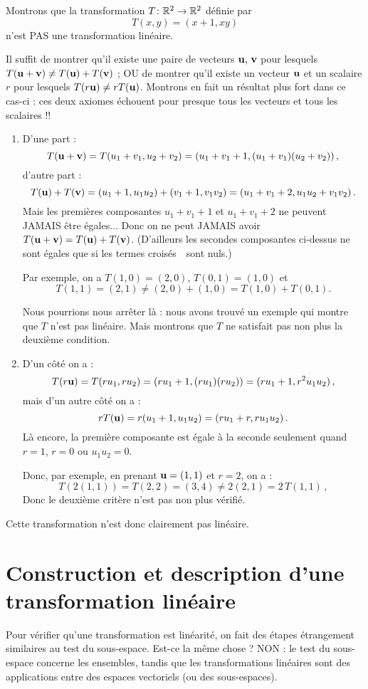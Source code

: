 \begin{myexample} Montrons que la transformation $T \colon \mathbb{R}^2 \to \mathbb{R}^2$ d\'efinie par
$$T(x,y) = (x+1, xy)$$ n'est PAS une transformation linéaire.

Il suffit de montrer qu'il existe une paire de vecteurs $\mathbf{u},\, \mathbf{v}$ 
pour lesquels $T(\mathbf{u}+\mathbf{v}) \neq T(\mathbf{u})+T(\mathbf{v})$ ; OU de montrer qu'il existe
un vecteur $\mathbf{u}$ et un scalaire $r$ pour lesquels $T(r\mathbf{u}) \neq rT(\mathbf{u})$.
Montrons en fait un résultat plus fort dans ce cas-ci : ces deux axiomes échouent pour presque tous les vecteurs
et tous les scalaires !\!!

\begin{enumerate}
\item D'une part : $$T(\mathbf{u} + \mathbf{v}) = T(u_1+v_1,u_2+v_2) = (u_1+v_1+1, (u_1+v_1)(u_2+v_2))\,,$$
d'autre part :
$$
T(\mathbf{u}) + T(\mathbf{v}) = (u_1+1,u_1u_2) + (v_1+1, v_1v_2) = (u_1+v_1+2, u_1u_2+v_1v_2)\,.
$$
Mais les premières composantes $u_1+v_1+1$ et $u_1+v_1+2$ ne peuvent JAMAIS être égales... Donc on ne peut JAMAIS avoir $T(\mathbf{u}+\mathbf{v}) = T(\mathbf{u})+T(\mathbf{v})$. (D'ailleurs les secondes composantes ci-dessus ne sont égales que si les \og termes croisés\ \fg\ sont nuls.)

Par exemple, on a $T(1,0)=(2,0)$, $T(0,1)=(1,0)$ et $$T(1,1)=(2,1) \not=(2,0)+(1,0)=T(1,0) +T(0,1).$$

Nous pourrions nous arrêter là : nous avons trouvé un exemple qui montre que $T$ n'est pas linéaire. Mais montrons que $T$ ne satisfait pas non plus la deuxième condition.
\item D'un côté on a :
$$
T(r\mathbf{u}) = T(ru_1,ru_2) = (ru_1+1, (ru_1)(ru_2)) = (ru_1+1, r^2u_1u_2)\,,
$$
mais d'un autre côté on a :
$$
rT(\mathbf{u}) = r(u_1+1,u_1u_2) = (ru_1+r, ru_1u_2)\,.
$$
L\`a encore, la première composante est égale \`a la seconde seulement quand $r=1$, $r=0$ ou $u_1u_2=0$. 

Donc, par exemple, en prenant $\mathbf{u} =(1,1)$ et $r=2$, on a : 
$$T(2(1,1))=T(2,2)=(3, 4)\not= 2(2,1)=2\, T(1,1)\,,$$
Donc le deuxième critère n'est pas non plus vérifié.
\end{enumerate}
Cette transformation n'est donc clairement pas linéaire.
\end{myexample}


\section{Construction et description d'une transformation linéaire}

Pour vérifier qu'une transformation est linéarité, on fait des étapes étrangement similaires au test du sous-espace.  Est-ce la même chose ?  NON : le
test du sous-espace concerne les ensembles, tandis que les transformations linéaires sont des applications
entre des espaces vectoriels (ou des sous-espaces).

